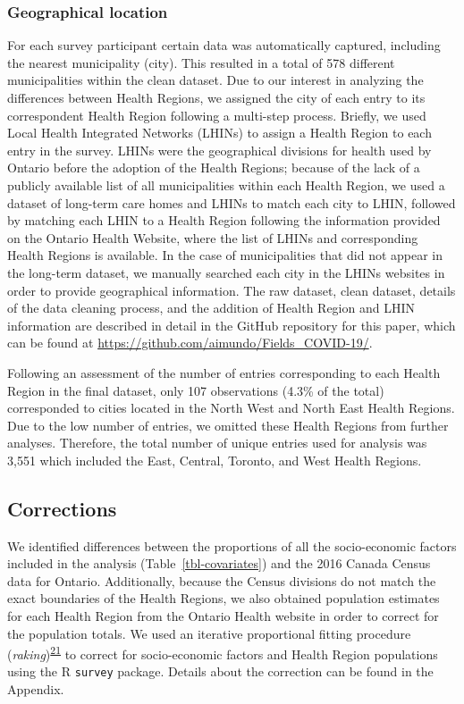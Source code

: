 \documentclass[
  letterpaper,
  DIV=11,
  numbers=noendperiod]{scrartcl}
\begin{document}
\hypertarget{sec-geographical-location}{%
\subsubsection{Geographical location}\label{sec-geographical-location}}

For each survey participant certain data was automatically captured,
including the nearest municipality (city). This resulted in a total of
578 different municipalities within the clean dataset. Due to our
interest in analyzing the differences between Health Regions, we
assigned the city of each entry to its correspondent Health Region
following a multi-step process. Briefly, we used Local Health Integrated
Networks (LHINs) to assign a Health Region to each entry in the survey.
LHINs were the geographical divisions for health used by Ontario before
the adoption of the Health Regions; because of the lack of a publicly
available list of all municipalities within each Health Region, we used
a dataset of long-term care homes and LHINs to match each city to LHIN,
followed by matching each LHIN to a Health Region following the
information provided on the Ontario Health Website, where the list of
LHINs and corresponding Health Regions is available. In the case of
municipalities that did not appear in the long-term dataset, we manually
searched each city in the LHINs websites in order to provide
geographical information. The raw dataset, clean dataset, details of the
data cleaning process, and the addition of Health Region and LHIN
information are described in detail in the GitHub repository for this
paper, which can be found at
\url{https://github.com/aimundo/Fields_COVID-19/}.

Following an assessment of the number of entries corresponding to each
Health Region in the final dataset, only 107 observations (4.3\% of the
total) corresponded to cities located in the North West and North East
Health Regions. Due to the low number of entries, we omitted these
Health Regions from further analyses. Therefore, the total number of
unique entries used for analysis was 3,551 which included the East,
Central, Toronto, and West Health Regions.

\hypertarget{corrections}{%
\subsection{Corrections}\label{corrections}}

We identified differences between the proportions of all the
socio-economic factors included in the analysis
(Table~\ref{tbl-covariates}) and the 2016 Canada Census data for
Ontario. Additionally, because the Census divisions do not match the
exact boundaries of the Health Regions, we also obtained population
estimates for each Health Region from the Ontario Health website in
order to correct for the population totals. We used an iterative
proportional fitting procedure
(\emph{raking})\textsuperscript{\protect\hyperlink{ref-deming1940}{21}}
to correct for socio-economic factors and Health Region populations
using the R \texttt{survey} package. Details about the correction can be
found in the Appendix.
\end{document}
